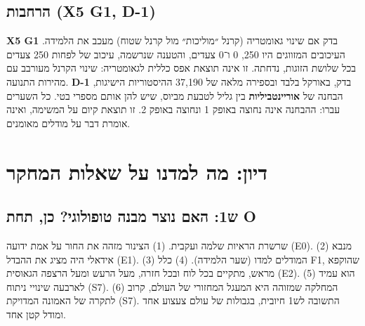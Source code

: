 \documentclass[12pt,a4paper]{article}
\newcommand{\en}[1]{\foreignlanguage{english}{#1}}   %
\newcommand{\chapterbreak}{\clearpage}
\let\oldsection\section
\renewcommand{\section}{\chapterbreak\oldsection}
\begin{document}
\subsection{הרחבות (\en{X5 G1}, \en{D-1})}
\textbf{\en{X5 G1}} בדק אם שינוי גאומטריה (קרנל ״מוליכות״ מול קרנל שטוח) מעכב את הלמידה. העיכובים המזווגים היו 250, 0 ו־0 צעדים, והטענה שנרשמה, עיכוב של לפחות 250 צעדים בכל שלושת הזוגות, נדחתה. זו אינה תוצאת אפס כללית לגאומטריה: שינוי הקרנל מעורבב עם מהירות התנועה. \textbf{\en{D-1}} בדק, באורקל בלבד ובספירה מלאה של 37,190 ההיסטוריות הישיגות, הבחנה של \textbf{אוריינטביליות} בין גליל לטבעת מביוס, שיש להן אותם מספרי בטי. כל השערים עברו: ההבחנה אינה נחוצה באופק 1 ונחוצה באופק 2. זו תוצאת קיום על המשימה, ואינה אומרת דבר על מודלים מאומנים.

\section{דיון: מה למדנו על שאלות המחקר}\label{sec:discussion}

\subsection{ש1: האם נוצר מבנה טופולוגי? כן, תחת O}
שרשרת הראיות שלמה ועקבית. (1) הצינור מזהה את החור על אמת ידועה (\en{E0}). (2) מנבא אידאלי היה מציג את ההבדל (\en{E1}). (3) המודלים למדו (שער הלמידה). (4) כלל F1, שהוקפא מראש, מתקיים בכל לוח ובכל חזרה, מעל הרעש ומעל הרצפה הגאוסית (\en{E2}). (5) הוא עמיד לארבעה שינויי ניתוח (S7). (6) המחלקה שמזוהה היא המעגל המחזורי של העולם, קרוב לתקרה של האמונה המדויקת (S7). התשובה לש1 חיובית, בגבולות של עולם צעצוע אחד ומודל קטן אחד.
\end{document}
